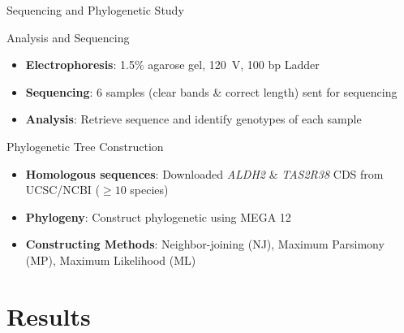 \documentclass[10pt,hyperref={colorlinks,citecolor=blue,urlcolor=peking_blue,linkcolor=}]{beamer}
\theoremstyle{plain}
\begin{document}
\begin{frame}{Sequencing and Phylogenetic Study}

    \begin{block}{Analysis and Sequencing}
        \begin{itemize}
        \item \textbf{Electrophoresis}: 1.5\% agarose gel, \qty{120}{\V}, 100 bp Ladder
        \item \textbf{Sequencing}: 6 samples (clear bands \& correct length) sent for sequencing 
        \item \textbf{Analysis}: Retrieve sequence and identify genotypes of each sample
        \end{itemize}
    \end{block}

    \begin{block}{Phylogenetic Tree Construction}
        \begin{itemize} 
            \item \textbf{Homologous sequences}: Downloaded \textit{ALDH2} \& \textit{TAS2R38} CDS from UCSC/NCBI ($\geq10$ species)
            \item \textbf{Phylogeny}: Construct phylogenetic using MEGA 12
            \item \textbf{Constructing Methods}: Neighbor-joining (NJ), Maximum Parsimony (MP), Maximum Likelihood (ML) 
        \end{itemize}
    \end{block}
\end{frame}

\section{Results}
\end{document}
